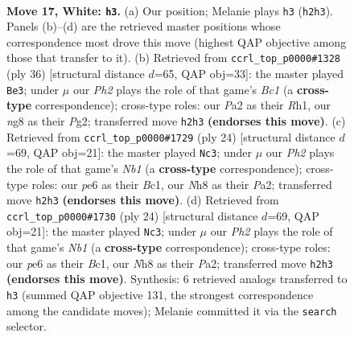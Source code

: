 \documentclass[11pt]{article}
\begin{document}
\clearpage

\begin{figure}[p]\centering
\begin{subfigure}{0.46\textwidth}\centering
\resizebox{\linewidth}{!}{%
\newchessgame
\chessboard[
  setfen={rnk3nN/pp6/4p3/1B1p1bpp/3p4/b7/P1P2PPP/3RK2R w K - 0 17},
  showmover=false,
  pgfstyle=straightmove, color=movearrow, markmove={h2-h3}
]}
\caption{}
\end{subfigure}\hfill
\begin{subfigure}{0.46\textwidth}\centering
\resizebox{\linewidth}{!}{%
\newchessgame
\chessboard[
  setfen={2b4r/p1n1pkbp/1ppp2p1/8/P7/2PB4/1P3PPP/R1B1K2R w KQ - 1 19},
  showmover=false,
  pgfstyle=straightmove, color=movearrow, markmove={c1-e3}
]}
\caption{}
\end{subfigure}
\\[4pt]
\begin{subfigure}{0.46\textwidth}\centering
\resizebox{\linewidth}{!}{%
\newchessgame
\chessboard[
  setfen={r3k2r/p1p1nppp/2p5/2b5/4P3/8/PP3PPP/RNBR1K2 w kq - 2 13},
  showmover=false,
  pgfstyle=straightmove, color=movearrow, markmove={b1-c3}
]}
\caption{}
\end{subfigure}\hfill
\begin{subfigure}{0.46\textwidth}\centering
\resizebox{\linewidth}{!}{%
\newchessgame
\chessboard[
  setfen={r3k2r/p1p1nppp/2p5/2b5/4P3/8/PP3PPP/RNBR1K2 w kq - 2 13},
  showmover=false,
  pgfstyle=straightmove, color=movearrow, markmove={b1-c3}
]}
\caption{}
\end{subfigure}
\caption{\textbf{Move 17, White: \texttt{h3}.} (a) Our position; Melanie plays \texttt{h3} (\texttt{h2h3}). Panels (b)--(d) are the retrieved master positions whose correspondence most drove this move (highest QAP objective among those that transfer to it). (b) Retrieved from \texttt{ccrl\_top\_p0000\#1328} (ply 36) [structural distance $d$=65, QAP obj=33]: the master played \texttt{Be3}; under $\mu$ our \emph{Ph2} plays the role of that game's \emph{Bc1} (a \textbf{cross-type} correspondence); cross-type roles: our \emph{P}a2 as their \emph{R}h1, our \emph{n}g8 as their \emph{P}g2; transferred move \texttt{h2h3} \textbf{(endorses this move)}. (c) Retrieved from \texttt{ccrl\_top\_p0000\#1729} (ply 24) [structural distance $d$=69, QAP obj=21]: the master played \texttt{Nc3}; under $\mu$ our \emph{Ph2} plays the role of that game's \emph{Nb1} (a \textbf{cross-type} correspondence); cross-type roles: our \emph{p}e6 as their \emph{B}c1, our \emph{N}h8 as their \emph{P}a2; transferred move \texttt{h2h3} \textbf{(endorses this move)}. (d) Retrieved from \texttt{ccrl\_top\_p0000\#1730} (ply 24) [structural distance $d$=69, QAP obj=21]: the master played \texttt{Nc3}; under $\mu$ our \emph{Ph2} plays the role of that game's \emph{Nb1} (a \textbf{cross-type} correspondence); cross-type roles: our \emph{p}e6 as their \emph{B}c1, our \emph{N}h8 as their \emph{P}a2; transferred move \texttt{h2h3} \textbf{(endorses this move)}. Synthesis: 6 retrieved analogs transferred to \texttt{h3} (summed QAP objective 131, the strongest correspondence among the candidate moves); Melanie committed it via the \texttt{search} selector.}
\label{fig:thought-m32}
\end{figure}
\end{document}
